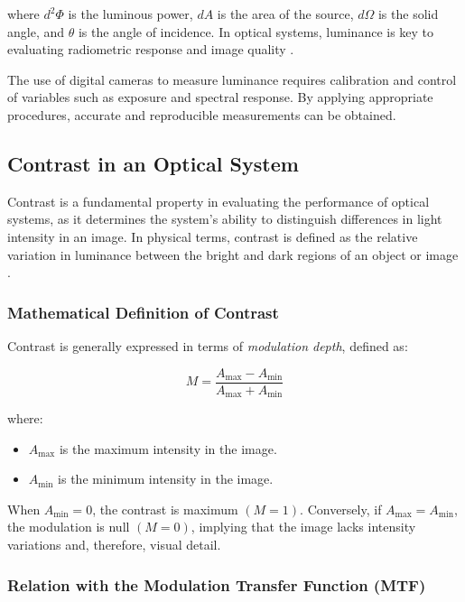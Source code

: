 where \( d^2\Phi \) is the luminous power, \( dA \) is the area of the source, \( d\Omega \) is the solid angle, and \( \theta \) is the angle of incidence. In optical systems, luminance is key to evaluating radiometric response and image quality \cite{Wuller2007TheMeters}.

The use of digital cameras to measure luminance requires calibration and control of variables such as exposure and spectral response. By applying appropriate procedures, accurate and reproducible measurements can be obtained.

\subsection{Contrast in an Optical System}

Contrast is a fundamental property in evaluating the performance of optical systems, as it determines the system's ability to distinguish differences in light intensity in an image. In physical terms, contrast is defined as the relative variation in luminance between the bright and dark regions of an object or image \cite{Boreman2001ModulationTT52}.

\subsubsection{Mathematical Definition of Contrast}

Contrast is generally expressed in terms of \textit{modulation depth}, defined as:

\begin{equation}
M = \frac{A_{\max} - A_{\min}}{A_{\max} + A_{\min}}
\label{eq:contraste}
\end{equation}

where:
\begin{itemize}
    \item $A_{\max}$ is the maximum intensity in the image.
    \item $A_{\min}$ is the minimum intensity in the image.
\end{itemize}

When $A_{\min} = 0$, the contrast is maximum $(M = 1)$. Conversely, if $A_{\max} = A_{\min}$, the modulation is null $(M = 0)$, implying that the image lacks intensity variations and, therefore, visual detail.

\subsubsection{Relation with the Modulation Transfer Function (MTF)}

